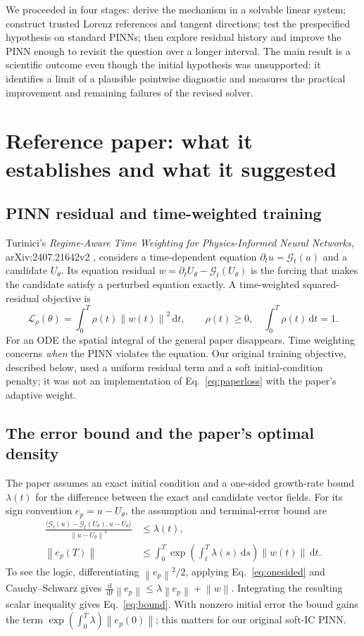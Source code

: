 \documentclass[11pt,a4paper]{article}
\newcommand{\norm}[1]{\left\lVert #1\right\rVert}
\newcommand{\dd}{\,\mathrm{d}}
\begin{document}
We proceeded in four stages: derive the mechanism in a solvable linear system; construct trusted Lorenz references and tangent directions; test the prespecified hypothesis on standard PINNs; then explore residual history and improve the PINN enough to revisit the question over a longer interval. The main result is a scientific outcome even though the initial hypothesis was unsupported: it identifies a limit of a plausible pointwise diagnostic and measures the practical improvement and remaining failures of the revised solver.

\section{Reference paper: what it establishes and what it suggested}
\subsection{PINN residual and time-weighted training}
Turinici's \emph{Regime-Aware Time Weighting for Physics-Informed Neural Networks}, arXiv:2407.21642v2 \cite{turinici}, considers a time-dependent equation $\partial_t u=\mathcal G_t(u)$ and a candidate $U_\theta$. Its equation residual $w=\partial_t U_\theta-\mathcal G_t(U_\theta)$ is the forcing that makes the candidate satisfy a perturbed equation exactly. A time-weighted squared-residual objective is
\begin{equation}\label{eq:paperloss}
 \mathcal L_{\rho}(\theta)=\int_0^T\rho(t)\norm{w(t)}^2\dd t,
 \qquad \rho(t)\geq0,\quad\int_0^T\rho(t)\dd t=1.
\end{equation}
For an ODE the spatial integral of the general paper disappears. Time weighting concerns \emph{when} the PINN violates the equation. Our original training objective, described below, used a uniform residual term and a soft initial-condition penalty; it was not an implementation of Eq.~\eqref{eq:paperloss} with the paper's adaptive weight.

\subsection{The error bound and the paper's optimal density}
The paper assumes an exact initial condition and a one-sided growth-rate bound $\lambda(t)$ for the difference between the exact and candidate vector fields. For its sign convention $e_p=u-U_\theta$, the assumption and terminal-error bound are
\begin{align}
\frac{\langle\mathcal G_t(u)-\mathcal G_t(U_\theta),u-U_\theta\rangle}{\norm{u-U_\theta}^2}&\leq\lambda(t),\label{eq:onesided}\\
\norm{e_p(T)}&\leq\int_0^T\exp\!\left(\int_t^T\lambda(s)\dd s\right)\norm{w(t)}\dd t.\label{eq:bound}
\end{align}
To see the logic, differentiating $\norm{e_p}^2/2$, applying Eq.~\eqref{eq:onesided} and Cauchy--Schwarz gives $\frac{\dd}{\dd t}\norm{e_p}\leq\lambda\norm{e_p}+\norm{w}$. Integrating the resulting scalar inequality gives Eq.~\eqref{eq:bound}. With nonzero initial error the bound gains the term $\exp(\int_0^T\lambda)\norm{e_p(0)}$; this matters for our original soft-IC PINN.
\end{document}
